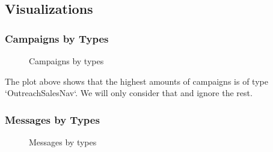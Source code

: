 \subsection{Visualizations}

\subsubsection*{Campaigns by Types}

\begin{figure}[H]
    \centering
    \caption{Campaigns by types}
    \label{fig:campaign-types-image}
\end{figure}

The plot above shows that the highest amounts of campaigns is of type `OutreachSalesNav`.
We will only consider that and ignore the rest.

\subsubsection*{Messages by Types}

\begin{figure}[H]
    \centering
    \caption{Messages by types}
    \label{fig:message-types-image}
\end{figure}

